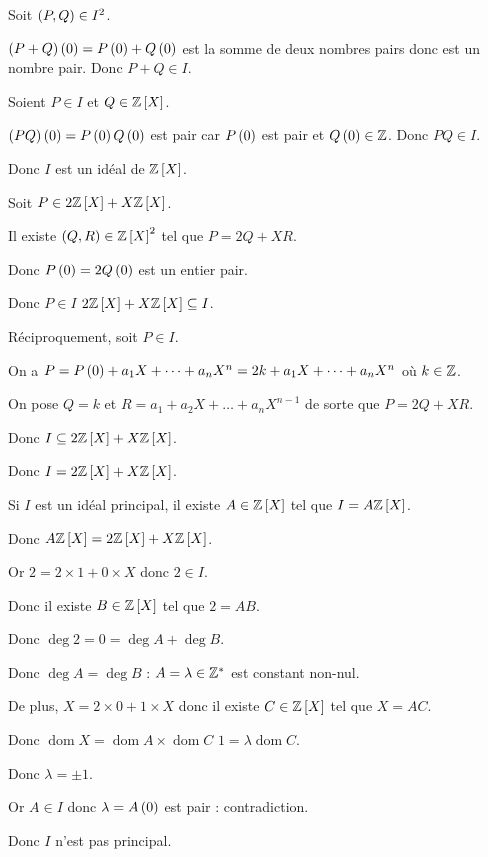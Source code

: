 \begin{corr}
Soit \(\left(P,Q\right)\in I^2\).

\(\left(P+Q\right)\left(0\right)=P\left(0\right)+Q\left(0\right)\) est la somme de deux nombres pairs donc est un nombre pair. Donc \(P+Q\in I\).

Soient \(P\in I\) et \(Q\in\poly[\Z]\).

\(\left(PQ\right)\left(0\right)=P\left(0\right)Q\left(0\right)\) est pair car \(P\left(0\right)\) est pair et \(Q\left(0\right)\in\mathbb{Z}\). Donc \(PQ\in I\).

Donc \(I\) est un idéal de \(\poly[\Z]\).

Soit \(P\in2\poly[\Z]+X\poly[\Z]\).

Il existe \(\paren{Q,R}\in\poly[\Z]^2\) tel que \(P=2Q+XR\).

Donc \(P\left(0\right)=2Q\left(0\right)\) est un entier pair.

Donc \(P\in I\) \ie \(2\poly[\Z]+X\poly[\Z]\subset I\).

Réciproquement, soit \(P\in I\).

On a \(P=P\left(0\right)+a_1X+\dots+a_nX^n=2k+a_1X+\dots+a_nX^n\) où \(k\in\mathbb{Z}\).

On pose \(Q=k\) et \(R=a_1+a_2X+\dots+a_nX^{n-1}\) de sorte que \(P=2Q+XR\).

Donc \(I\subset2\poly[\Z]+X\poly[\Z]\).

Donc \(I=2\poly[\Z]+X\poly[\Z]\).

Si \(I\) est un idéal principal, il existe \(A\in\poly[\Z]\) tel que \(I=A\poly[\Z]\).

Donc \(A\poly[\Z]=2\poly[\Z]+X\poly[\Z]\).

Or \(2=2\times1+0\times X\) donc \(2\in I\).

Donc il existe \(B\in\poly[\Z]\) tel que \(2=AB\).

Donc \(\deg2=0=\deg A+\deg B\).

Donc \(\deg A=\deg B\) : \(A=\lambda\in\mathbb{Z}^*\) est constant non-nul.

De plus, \(X=2\times0+1\times X\) donc il existe \(C\in\poly[\Z]\) tel que \(X=AC\).

Donc \(\operatorname{dom}X=\operatorname{dom}A\times\operatorname{dom}C\) \ie \(1=\lambda\operatorname{dom}C\).

Donc \(\lambda=\pm1\).

Or \(A\in I\) donc \(\lambda=A\left(0\right)\) est pair : contradiction.

Donc \(I\) n'est pas principal.
\end{corr}

